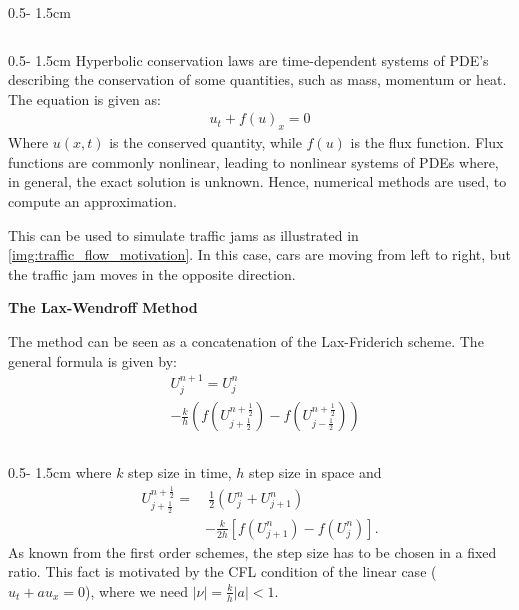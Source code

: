 \documentclass{uibposter}
\begin{document}
\begin{frame}[fragile]
\begin{columns}
\begin{column}{0.5\textwidth - 1.5cm}
\begin{column}{0.5\textwidth - 1.5cm}
Hyperbolic conservation laws are time-dependent systems of PDE's describing the conservation of some quantities, such as mass, momentum or heat. The equation is given as:
\begin{align*}
    u_t + f(u)_x = 0
\end{align*}
Where $u(x,t)$ is the conserved quantity, while $f(u)$ is the flux function. Flux functions are commonly nonlinear, leading to nonlinear systems of PDEs where, in general, the exact solution is unknown. Hence, numerical methods are used, to compute an approximation. 

\vspace{0.5cm}
This can be used to simulate traffic jams as illustrated in \cref{img:traffic_flow_motivation}. In this case, cars are moving from left to right, but the traffic jam moves in the opposite direction. 

\vspace{0.5cm}
\textbf{The Lax-Wendroff Method}

\vspace{0.5cm}
The method can be seen as a concatenation of the Lax-Friderich scheme.
The general formula is given by:
\begin{align*}
&U_j^{n+1} = U_j^n\\
&- \frac{k}{h}\left(f\left(U_{j+\frac{1}{2}}^{n+\frac{1}{2}}\right) - f\left(U_{j-\frac{1}{2}}^{n+\frac{1}{2}}\right)\right)
\end{align*}

\end{column}
\begin{column}{0.5\textwidth - 1.5cm}
where $k$ step size in time, $h$ step size in space and
\begin{align*}
U_{j+\frac{1}{2}}^{n+\frac{1}{2}} =&~ \frac{1}{2} (U_j^n + U_{j+1}^n)\\
&- \frac{k}{2h}[f(U_{j+1}^n) - f(U_j^n)].
\end{align*}
As known from the first order schemes, the step size has to be chosen in a fixed ratio. This fact is motivated by the CFL condition of the linear case ($u_t + au_x = 0$), where we need $|\nu| = \frac{k}{h} |a| < 1$. 


\end{column}
\end{column}
\end{columns}
\end{frame}
\end{document}
